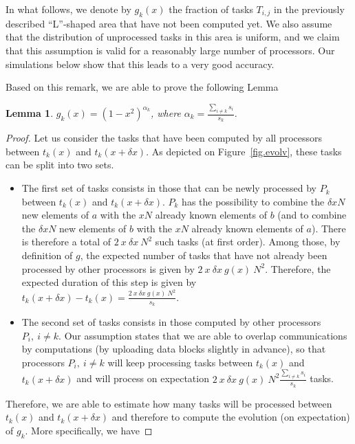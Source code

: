 \documentclass[a4paper,10pt]{article}
\newtheorem{lemma}[theorem]{Lemma}
\newcommand{\ema}[1]{\ensuremath{#1}\xspace}
\newcommand{\dx}{\ema{\delta x}}
\begin{document}
In what follows, we denote by $g_k(x)$ the fraction of tasks $T_{i,j}$
in the previously described ``L''-shaped area that have not been
computed yet. We also assume that the distribution of unprocessed
tasks in this area is uniform, and we claim that this assumption is
valid for a reasonably large number of processors. Our simulations
below show that this leads to a very good accuracy.


Based on this remark, we are able to prove the following Lemma
\begin{lemma}
\label{lemg}
$g_k(x)=(1-x^2)^{\alpha_k}$, where $\alpha_k = \frac{\sum_{i \neq k} s_i}{s_k}$.
\end{lemma}



\begin{proof}
Let us consider the tasks that have been computed by all processors
between $t_k(x)$ and $t_k(x+\dx)$. As depicted on
Figure~\ref{fig.evolv}, these tasks can be split into two sets.
\begin{itemize}
\item The first set of tasks consists in those that can be newly
  processed by $P_k$ between $t_k(x)$ and $t_k(x+\dx)$. $P_k$ has the
  possibility to combine the $\dx N$ new elements of $a$ with the $x
  N$ already known elements of $b$ (and to combine the $\dx N$ new
  elements of $b$ with the $x N$ already known elements of $a$). There
  is therefore a total of $2~ x~ \dx~ N^2$ such tasks (at first
  order). Among those, by definition of $g$, the expected number of
  tasks that have not already been processed by other processors is
  given by $2 ~x~ \dx ~g(x)~ N^2$. Therefore, the expected duration of
  this step is given by $t_k(x+\dx) - t_k(x) = \frac{2 ~x ~\dx ~g(x)~
    N^2}{s_k}$.

\item The second set of tasks consists in those computed by other
  processors $P_i,~i \neq k$. Our assumption states
  that we are able to overlap communications by computations (by
  uploading data blocks slightly in advance), so that processors
  $P_i,~i \neq k$ will keep processing tasks between $t_k(x)$ and
  $t_k(x+\dx)$ and will process on expectation $2 ~x~ \dx~ g(x)~
  N^2 \frac{\sum_{i \neq k} s_i }{s_k}$ tasks.

\end{itemize}
Therefore, we are able to estimate how many tasks will be processed
between $t_k(x)$ and $t_k(x+\dx)$ and therefore to compute the
evolution (on expectation) of $g_k$. More specifically, we have


\end{proof}
\end{document}
